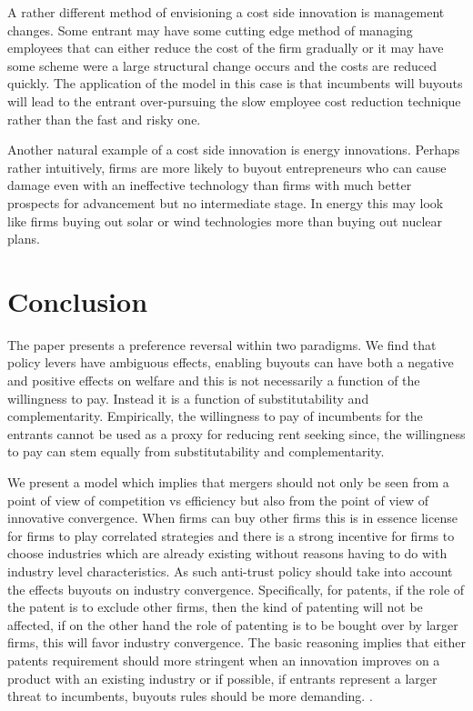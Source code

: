 \documentclass[12pt]{report}
\numberwithin{equation}{section}
\begin{document}
A rather different method of envisioning a cost side innovation is management changes. Some entrant may have some cutting edge method of managing employees that can either reduce the cost of the firm gradually or it may have some scheme were a large structural change occurs and the costs are reduced quickly. The application of the model in this case is that incumbents will buyouts will lead to the entrant over-pursuing the slow employee cost reduction technique rather than the fast and risky one.  

Another natural example of a cost side innovation is energy innovations. Perhaps rather intuitively, firms are more likely to buyout entrepreneurs who can cause damage even with an ineffective technology than firms with much better prospects for advancement but no intermediate stage. In energy this may look like firms buying out solar or wind technologies more than buying out nuclear plans.   



\section{Conclusion}


The paper presents a preference reversal within two paradigms. We find that policy levers have ambiguous effects, enabling buyouts can have both a negative and positive effects on welfare and this is not necessarily a function of the willingness to pay. Instead it is a function of substitutability and complementarity. Empirically, the willingness to pay of incumbents for the entrants cannot be used as a proxy for reducing rent seeking since, the willingness to pay can stem equally from substitutability and complementarity. 

We present a model which implies that mergers should not only be seen from a point of view of competition vs efficiency but also from the point of view of innovative convergence. When firms can buy other firms this is in essence license for firms to play correlated strategies and there is a strong incentive for firms to choose industries which are already existing without reasons having to do with industry level characteristics. As such anti-trust policy should take into account the effects buyouts on industry convergence. Specifically, for patents, if the role of the patent is to exclude other firms, then the kind of patenting will not be affected, if on the other hand the role of patenting is to be bought over by larger firms, this will favor industry convergence. The basic reasoning implies that either patents requirement should more stringent when an innovation improves on a product with an existing industry or if possible, if entrants represent a larger threat to incumbents, buyouts rules should be more demanding. . 
\end{document}
